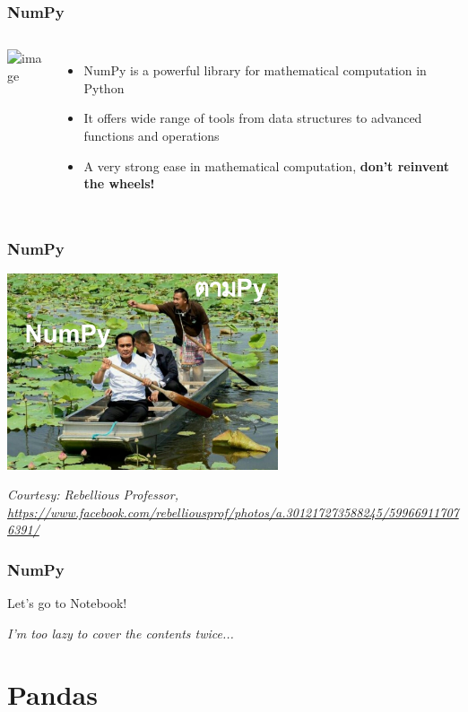 \documentclass[aspectratio=169]{beamer}
\begin{document}
\begin{frame}
    \frametitle{NumPy}
    \begin{columns}
            \begin{center}
                \includegraphics<2->[width=\columnwidth]{images/numpy-logo.png}
            \end{center}
        \begin{itemize}[<+(2)->]
            \item NumPy is a powerful library for mathematical computation in Python
            \item It offers wide range of tools from data structures to advanced functions and operations
            \item A very strong ease in mathematical computation, \textbf{don't reinvent the wheels!}
        \end{itemize}
    \end{columns}
\end{frame}

\begin{frame}
    \frametitle{NumPy}

    \centering
    \includegraphics[width=0.6\textwidth]{images/numpy-meme.jpg}

    {\scriptsize \textit{Courtesy: Rebellious Professor, \url{https://www.facebook.com/rebelliousprof/photos/a.301217273588245/599669117076391/}}}
\end{frame}

\begin{frame}
    \frametitle{NumPy}
    \centering
    { \Huge Let's go to Notebook! }

    \textit{I'm too lazy to cover the contents twice...}
\end{frame}

\section{Pandas}
\end{document}

